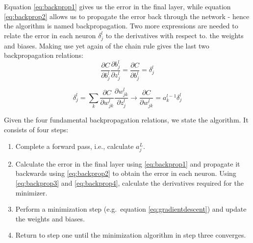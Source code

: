\documentclass{Dissertate}
\providecommand{\tightlist}{%
  \setlength{\itemsep}{0pt}\setlength{\parskip}{0pt}}
\begin{document}
Equation \ref{eq:backprop1} gives us the error in the final layer,
while equation \ref{eq:backprop2} allows us to propagate the error
back through the network - hence the algorithm is named backpropagation.
Two more expressions are needed to relate the error in each neuron
\(\delta^l_j\) to the derivatives with respect to. the weights and biases. Making
use yet again of the chain rule gives the last two backpropagation
relations: \begin{equation}
\frac{\partial C}{\partial b^l_{j}}\frac{\partial b^l_{j}}{\partial z^l_{j}}=\frac{\partial C}{\partial b^l_{j}}=\delta^l_j
\label{eq:backprop3}\end{equation}

\begin{equation}
\delta^l_j=\sum_k\frac{\partial C}{\partial w^l_{jk}}\frac{\partial w^l_{jk}}{\partial z^l_{j}}\to \frac{\partial C}{\partial w^l_{jk}}=a^{l-1}_{k}\delta^l_j
\label{eq:backprop4}\end{equation}

Given the four fundamental backpropagation relations, we state the
algorithm. It consists of four steps:

\begin{enumerate}
\def\labelenumi{\arabic{enumi}.}
\tightlist
\item
  Complete a forward pass, i.e., calculate \(a^L_j\).
\item
  Calculate the error in the final layer using \ref{eq:backprop1}
  and propagate it backwards using \ref{eq:backprop2} to obtain the
  error in each neuron. Using \ref{eq:backprop3} and
  \ref{eq:backprop4}, calculate the derivatives required for the
  minimizer.
\item
  Perform a minimization step (e.g.~equation
  \ref{eq:gradientdescent}) and update the weights and biases.
\item
  Return to step one until the minimization algorithm in step three
  converges.
\end{enumerate}
\end{document}
